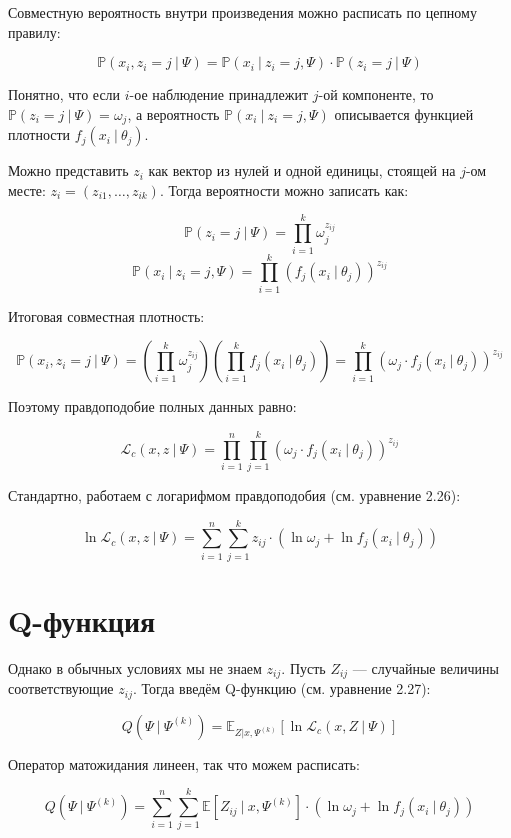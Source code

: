 \documentclass[14pt, a4paper, oneside]{memoir}
\begin{document}
Совместную вероятность внутри произведения можно расписать по цепному правилу:

\[\mathbb{P} (x_i, z_i = j ~|~ \Psi) = \mathbb{P}(x_i ~|~ z_i = j, \Psi) \cdot \mathbb{P}(z_i = j ~|~ \Psi)\]

Понятно, что если $i$-ое наблюдение принадлежит $j$-ой компоненте, то $\mathbb{P}(z_i = j ~|~ \Psi) = \omega_j$, а вероятность $\mathbb{P}(x_i~|~ z_i=j, \Psi)$ описывается функцией плотности $f_j(x_i~|~ \theta_j)$.

Можно представить $z_i$ как вектор из нулей и одной единицы, стоящей на $j$-ом месте: $z_i = (z_{i1}, \dots, z_{ik})$. Тогда вероятности можно записать как:

\[\mathbb{P}(z_i = j ~|~ \Psi) = \prod_{i=1}^k \omega_j^{z_{ij}}\]
\[\mathbb{P}(x_i ~|~ z_i = j, \Psi) = \prod_{i=1}^k (f_j(x_i ~|~ \theta_j))^{z_{ij}}\]

Итоговая совместная плотность:

\[\mathbb{P}(x_i, z_i = j ~|~ \Psi) = \left(\prod_{i=1}^k \omega_j^{z_{ij}}\right) \left(\prod_{i=1}^k f_j(x_i~|~\theta_j)\right) = \prod_{i=1}^k (\omega_j \cdot f_j(x_i~|~ \theta_j))^{z_{ij}}\]

Поэтому правдоподобие полных данных равно:

\[\mathcal{L}_c(x, z ~|~ \Psi) = \prod_{i=1}^n \prod_{j=1}^k (\omega_j \cdot f_j(x_i~|~ \theta_j))^{z_{ij}}\]

Стандартно, работаем с логарифмом правдоподобия \cite{mclachlan2000finite}{ (см. уравнение 2.26)}:

\[\ln \mathcal{L}_c (x, z ~|~ \Psi) = \sum_{i=1}^n \sum_{j=1}^k z_{ij} \cdot (\ln \omega_j + \ln f_j(x_i ~|~ \theta_j))\]


\section{Q-функция}

Однако в обычных условиях мы не знаем $z_{ij}$. Пусть $Z_{ij}$ --- случайные величины соответствующие $z_{ij}$. Тогда введём Q-функцию \cite{mclachlan2000finite}{ (см. уравнение 2.27)}:

\[Q(\Psi ~|~ \Psi^{(k)}) = \mathbb{E}_{Z |  x, \Psi^{(k)}}[\ln \mathcal{L}_c(x, Z ~|~ \Psi)]\]

Оператор матожидания линеен, так что можем расписать:

\[Q(\Psi ~|~ \Psi^{(k)}) = \sum_{i=1}^n \sum_{j=1}^k \mathbb{E}[Z_{ij} ~|~ x, \Psi^{(k)}] \cdot (\ln \omega_j + \ln f_j(x_i ~|~ \theta_j))\]
\end{document}
